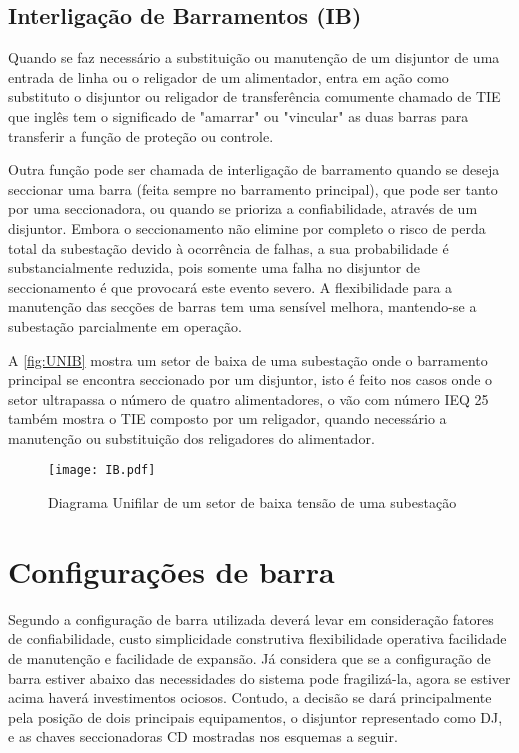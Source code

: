 		\subsection{Interligação de Barramentos (IB)}
			\label{sec:IB}
			Quando se faz necessário a substituição ou manutenção de um disjuntor de uma entrada de linha ou o religador de um alimentador, entra em ação como substituto o disjuntor ou religador de transferência comumente chamado de TIE que inglês tem o significado de "amarrar" ou "vincular" as duas barras para transferir a função de proteção ou controle.\par
			Outra função pode ser chamada de interligação de barramento quando se deseja seccionar uma barra (feita sempre no barramento principal), que pode ser tanto por uma seccionadora, ou quando se prioriza a confiabilidade, através de um disjuntor. Embora o seccionamento não elimine por completo o risco de perda total da subestação devido à ocorrência de falhas, a sua probabilidade é substancialmente reduzida, pois somente uma falha no disjuntor de seccionamento é que provocará este evento severo. A flexibilidade para a manutenção das secções de barras tem uma sensível melhora, mantendo-se a subestação parcialmente em operação.\par
			A \autoref{fig:UNIB} mostra um setor de baixa de uma subestação onde o barramento principal se encontra seccionado por um disjuntor, isto é feito nos casos onde o setor ultrapassa o número de quatro alimentadores, o vão com número IEQ 25 também mostra o TIE composto por um religador, quando necessário a manutenção ou substituição dos religadores do alimentador.\par
			\begin{figure}[!htb]
				\caption{Diagrama Unifilar de um setor de baixa tensão de uma subestação}
				\centering
				\texttt{[image: IB.pdf]}
				\label{fig:UNIB}
				\end{figure}			
	\section{Configurações de barra}
		Segundo  a configuração de barra utilizada deverá levar em consideração fatores de confiabilidade, custo simplicidade construtiva flexibilidade operativa facilidade de manutenção e facilidade de expansão. Já  considera que se a configuração de barra estiver abaixo das necessidades do sistema pode fragilizá-la, agora se estiver acima haverá investimentos ociosos. Contudo, a decisão se dará principalmente pela posição de dois principais equipamentos, o disjuntor representado como DJ, e as chaves seccionadoras CD mostradas nos esquemas a seguir.
